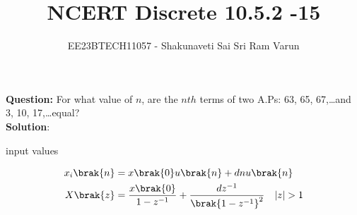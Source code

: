 \documentclass[journal,12pt,twocolumn]{IEEEtran}
\theoremstyle{remark}
\begin{document}

\vspace{3cm}

\title{NCERT Discrete 10.5.2 -15}
\author{EE23BTECH11057 - Shakunaveti Sai Sri Ram Varun$^{}$%
}
\maketitle
\newpage
\bigskip

\vspace{2cm}
\textbf{Question: }
For what value of $ n$, are the $ nth$ terms of two A.Ps: 63, 65, 67,\dots and 3, 10, 17,\dots equal?\\
\vspace{0.5cm}
\textbf{Solution}:
\fi
\begin{table}[htbp] 
\centering

\caption{input values}
\label{tab: Table10.5.2.15}
\end{table}
\begin{align}
x_i\brak{n} &= x\brak{0}u\brak{n} + dnu\brak{n}\\
X\brak{z} &= \frac{x\brak{0}}{1-z^{-1}} + \frac{dz^{-1}}{\brak{1-z^{-1}}^{2}} \quad |z|>1
\end{align}
\end{document}
